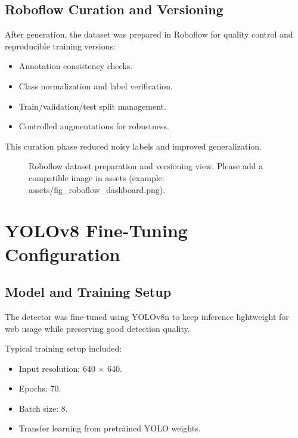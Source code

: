 \documentclass[12pt,a4paper,openany]{report}
\begin{document}
\subsection{Roboflow Curation and Versioning}

After generation, the dataset was prepared in Roboflow for quality control and reproducible training versions:
\begin{itemize}
    \item Annotation consistency checks.
    \item Class normalization and label verification.
    \item Train/validation/test split management.
    \item Controlled augmentations for robustness.
\end{itemize}

This curation phase reduced noisy labels and improved generalization.

\begin{figure}[H]
    \centering
    \caption{Roboflow dataset preparation and versioning view. Please add a compatible image in assets (example: assets/fig_roboflow_dashboard.png).}
    \label{fig:roboflow_dashboard}
\end{figure}

\section{YOLOv8 Fine-Tuning Configuration}

\subsection{Model and Training Setup}

The detector was fine-tuned using YOLOv8n to keep inference lightweight for web usage while preserving good detection quality.

Typical training setup included:
\begin{itemize}
    \item Input resolution: 640 \(\times\) 640.
    \item Epochs: 70.
    \item Batch size: 8.
    \item Transfer learning from pretrained YOLO weights.
\end{itemize}
\end{document}
